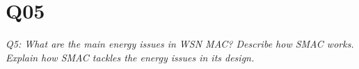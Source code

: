 \chapter{Q05}
\emph{Q5: What are the main energy issues in WSN MAC? Describe how SMAC works.
Explain how SMAC tackles the energy issues in its design.}

